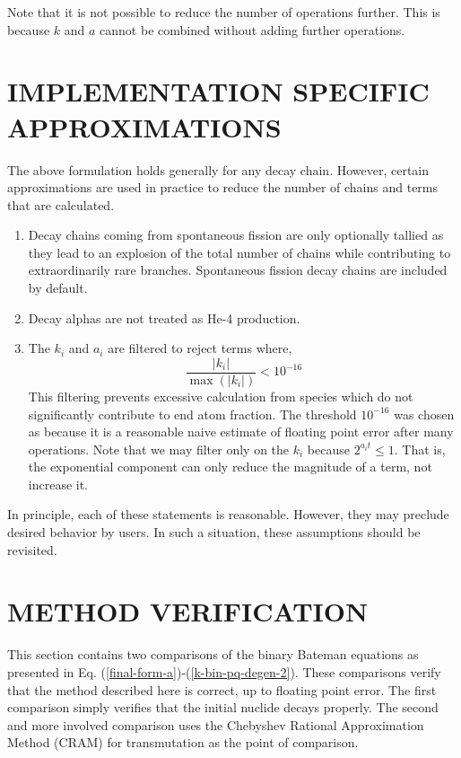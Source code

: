 \documentclass[letterpaper]{physor2018}
\begin{document}
Note that it is not possible to reduce the number of operations further.  This
is because  $k$ and $a$ cannot be combined without adding further
operations.

\section{IMPLEMENTATION SPECIFIC APPROXIMATIONS}
\label{sec-impl-spec-approx}
The above formulation holds generally for any decay chain.  However, certain
approximations are used in practice to reduce the number of chains and terms
that are calculated.
\begin{enumerate}
\item Decay chains coming from spontaneous fission are only optionally tallied as they
   lead to an explosion of the total number of chains while contributing to
   extraordinarily rare branches. Spontaneous fission decay chains are included by default.
\item Decay alphas are not treated as He-4 production.
\item The $k_i$ and $a_i$ are filtered to reject terms where,
   \begin{equation}
   \label{filter-cond}
   \frac{|k_i|}{\max(|k_i|)} < 10^{-16}
   \end{equation}
   This filtering prevents excessive
   calculation from species which do not significantly contribute to
   end atom fraction. The threshold $10^{-16}$ was chosen as
   because it is a reasonable naive estimate of floating point error after
   many operations. Note that we may filter only on the $k_i$ because
   $2^{a_i t} \le 1$.  That is, the exponential component can only
   reduce the magnitude of a term, not increase it.
\end{enumerate}
In principle, each of these statements is reasonable. However, they
may preclude desired behavior by users. In such a situation, these
assumptions should be revisited.


\section{METHOD VERIFICATION}
\label{sec-verify}
This section contains two comparisons of the binary Bateman equations
as presented in Eq. (\ref{final-form-a})-(\ref{k-bin-pq-degen-2}). These
comparisons verify that the method described here is correct, up to
floating point error. The first comparison simply verifies that the
initial nuclide decays properly. The second and more involved comparison
uses the Chebyshev Rational Approximation Method (CRAM)
for transmutation \cite{pusa2010computing,pusa2012correction} as the point
of comparison.
\end{document}
